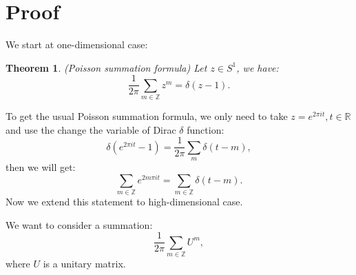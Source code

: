 \documentclass[draft]{article}
\newtheorem{thm}{Theorem}[section]
\theoremstyle{definition}
\theoremstyle{remark}
\newcommand{\R}{\mathbb{R}}
\newcommand{\Z}{\mathbb{Z}}
\begin{document}
\section{Proof}
We start at one-dimensional case:
\begin{thm}(Poisson summation formula)
	Let $z \in S^1$, we have:
	$$
	\frac{1}{2\pi}\sum_{m\in \Z}z^m=\delta\left(z-1\right).
	$$
\end{thm}
To get the usual Poisson summation formula, we only need to take $z=e^{2\pi it}, t\in \R$ and use the change the variable of Dirac $\delta$ function:
$$
\delta\left(e^{2\pi it}-1\right)=\frac{1}{2\pi}\sum_{m} \delta\left(t-m\right),
$$
then we will get:
$$
\sum_{m\in \Z}e^{2m\pi it}=\sum_{m\in \Z} \delta\left(t-m\right).
$$
Now we extend this statement to high-dimensional case.

We want to consider a summation: 
$$\frac{1}{2\pi}\sum_{m\in \Z}U^{m},$$
where $U$ is a unitary matrix.
\end{document}

